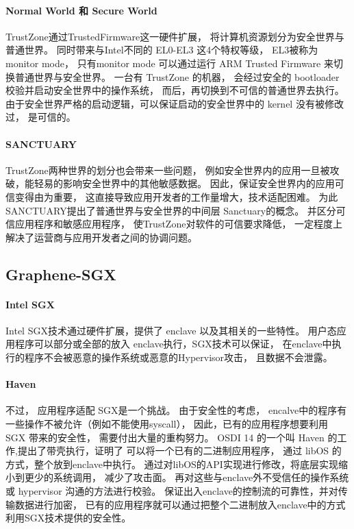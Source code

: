 \paragraph{Normal World 和 Secure World}TrustZone通过TrustedFirmware这一硬件扩展，
将计算机资源划分为安全世界与普通世界。
同时带来与Intel不同的 EL0-EL3 这4个特权等级，
EL3被称为 monitor mode，
只有monitor mode 可以通过运行 ARM Trusted Firmware 来切换普通世界与安全世界。
一台有 TrustZone 的机器，
会经过安全的 bootloader 校验并启动安全世界中的操作系统，
而后，再切换到不可信的普通世界去执行。
由于安全世界严格的启动逻辑，可以保证启动的安全世界中的 kernel 没有被修改过，
是可信的。
\paragraph{SANCTUARY}TrustZone两种世界的划分也会带来一些问题，
例如安全世界内的应用一旦被攻破，能轻易的影响安全世界中的其他敏感数据。
因此，保证安全世界内的应用可信变得由为重要，
这直接导致应用开发者的工作量增大，技术适配困难。
为此SANCTUARY提出了普通世界与安全世界的中间层 Sanctuary的概念。
并区分可信应用程序和敏感应用程序，
使TrustZone对软件的可信要求降低，
一定程度上解决了运营商与应用开发者之间的协调问题。

\subsection{Graphene-SGX}
\paragraph{Intel SGX}Intel SGX技术通过硬件扩展，提供了 enclave 以及其相关的一些特性。
用户态应用程序可以部分或全部的放入 enclave执行，SGX技术可以保证，
在enclave中执行的程序不会被恶意的操作系统或恶意的Hypervisor攻击，
且数据不会泄露。
\paragraph{Haven}不过，
应用程序适配 SGX是一个挑战。
由于安全性的考虑，
encalve中的程序有一些操作不被允许（例如不能使用syscall），
因此，已有的应用程序想要利用 SGX 带来的安全性，
需要付出大量的重构努力。
OSDI 14 的一个叫 Haven 的工作,提出了带壳执行，证明了
可以将一个已有的二进制应用程序，
通过 libOS 的方式，整个放到enclave中执行。
通过对libOS的API实现进行修改，将底层实现缩小到更少的系统调用，
减少了攻击面。
再对这些与enclave外不受信任的操作系统或 hypervisor 沟通的方法进行校验。
保证出入enclave的控制流的可靠性，并对传输数据进行加密，
已有的应用程序就可以通过把整个二进制放入enclave中的方式利用SGX技术提供的安全性。
